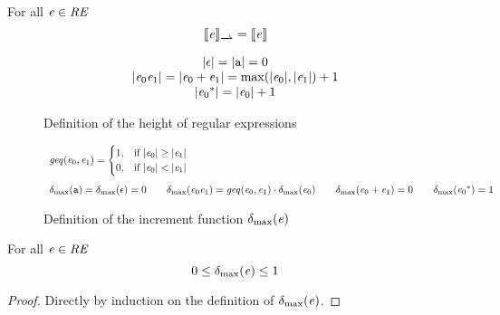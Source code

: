 \begin{corollary}
 For all $\mathit {e}\in\mathit {RE}$
 \[
  \opSem{\re}{\parDer{}{}}=\sem{\re}
 \]
\end{corollary}

\begin{figure}
 $$
  \begin{array}{c}
   {\mid}{\ensuremath{\mathtt {\epsilon}}}{\mid}={\mid}{\mathtt {a}}{\mid}=0                                                              \\
   {\mid}{\mathit {e}_0\mathit {e}_1}{\mid}={\mid}{\mathit {e}_0\mathbin{+}\mathit {e}_1}{\mid}=\max({\mid}{\mathit {e}_0}{\mid},{\mid}{\mathit {e}_1}{\mid})+1 \\
   {\mid}{{\mathit {e}_0}^*}{\mid}={\mid}{\mathit {e}_0}{\mid}+1
  \end{array}
 $$
 \caption{Definition of the height of regular expressions}
 \label{fig:height}
\end{figure}

\begin{figure}
 $$
  \begin{array}{l}
   \mathit{geq}({\mathit {e}_0},{\mathit {e}_1})=
   \begin{cases}
    1, & \text{if } {\mid}{\ensuremath{\mathit {e}}_0}{\mid} \geq {\mid}{\ensuremath{\mathit {e}}_1}{\mid} \\
    0, & \text{if } {\mid}{\ensuremath{\mathit {e}}_0}{\mid} < {\mid}{\mathit {e}_1}{\mid}
   \end{cases} \\[4ex]
   {\delta_{\max}}({\mathtt {a}})={\delta_{\max}}({\mathtt {\epsilon}})=0                                      \qquad
   {\delta_{\max}}({\mathit {e}_0\mathit {e}_1})=\mathit{geq}({\mathit {e}_0},{\mathit {e}_1})\cdot{\delta_{\max}}({\mathit {e}_0}) \qquad
   {\delta_{\max}}({\mathit {e}_0\mathbin{+}\mathit {e}_1})=0                                         \qquad
   {\delta_{\max}}({{\mathit {e}_0}^*})=1
  \end{array}
 $$
 \caption{Definition of the increment function ${\delta_{\max}}({\mathit {e}})$}
 \label{fig:inc-pred}
\end{figure}

\begin{lemma}\label{bounds}
 For all $\mathit {e}\in\mathit {RE}$
 \[0\leq{\delta_{\max}}({\mathit {e}})\leq 1\]
\end{lemma}
\begin{proof}
 Directly by induction on the definition of ${\delta_{\max}}({\mathit {e}})$.
\end{proof}

